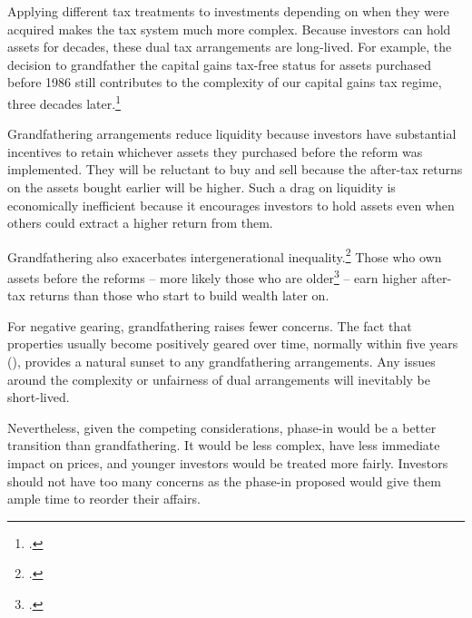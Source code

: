 Applying different tax treatments to investments depending on when they were acquired makes the tax system much more complex. Because investors can hold assets for decades, these dual tax arrangements are long-lived.  For example, the decision to grandfather the capital gains tax-free status for assets purchased before 1986 still contributes to the complexity of our capital gains tax regime, three decades later.\footcite[][75]{HenryTaxReview2010} 

Grandfathering arrangements reduce liquidity because investors have substantial incentives to retain whichever assets they purchased before the reform was implemented. They will be reluctant to buy and sell because the after-tax returns on the assets bought earlier will be higher. Such a drag on liquidity is economically inefficient because it encourages investors to hold assets even when others could extract a higher return from them. 

Grandfathering also exacerbates intergenerational inequality.\footcite{DaleyWoodWeidmannEtAl2014}  Those who own assets before the reforms – more likely those who are older\footcite[][14]{DaleyWoodWeidmannEtAl2014}  – earn higher after-tax returns than those who start to build wealth later on. 

For negative gearing, grandfathering raises fewer concerns. The fact that properties usually become positively geared over time, normally within five years (), provides a natural sunset to any grandfathering arrangements. Any issues around the complexity or unfairness of dual arrangements will inevitably be short-lived. 

Nevertheless, given the competing considerations, phase-in would be a better transition than grandfathering. It would be less complex, have less immediate impact on prices, and younger investors would be treated more fairly. Investors should not have too many concerns as the phase-in proposed would give them ample time to reorder their affairs.
















\clearpage
%




